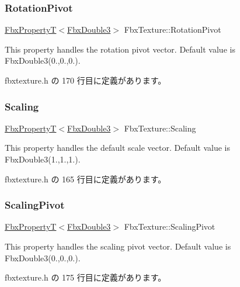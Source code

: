 \subsubsection{\texorpdfstring{Rotation\+Pivot}{RotationPivot}}
{\footnotesize\ttfamily \hyperlink{class_fbx_property_t}{Fbx\+PropertyT}$<$\hyperlink{fbxtypes_8h_ae0a96f14cde566774c7553aa7523b7a7}{Fbx\+Double3}$>$ Fbx\+Texture\+::\+Rotation\+Pivot}

This property handles the rotation pivot vector. Default value is Fbx\+Double3(0.,0.,0.). 

 fbxtexture.\+h の 170 行目に定義があります。

\mbox{\label{class_fbx_texture_a0fb4219993fe8b6fcad89b62d22d2489}} 
\subsubsection{\texorpdfstring{Scaling}{Scaling}}
{\footnotesize\ttfamily \hyperlink{class_fbx_property_t}{Fbx\+PropertyT}$<$\hyperlink{fbxtypes_8h_ae0a96f14cde566774c7553aa7523b7a7}{Fbx\+Double3}$>$ Fbx\+Texture\+::\+Scaling}

This property handles the default scale vector. Default value is Fbx\+Double3(1.,1.,1.). 

 fbxtexture.\+h の 165 行目に定義があります。

\mbox{\label{class_fbx_texture_acf9aad8b79662d0cd8f3d336d0414dee}} 
\subsubsection{\texorpdfstring{Scaling\+Pivot}{ScalingPivot}}
{\footnotesize\ttfamily \hyperlink{class_fbx_property_t}{Fbx\+PropertyT}$<$\hyperlink{fbxtypes_8h_ae0a96f14cde566774c7553aa7523b7a7}{Fbx\+Double3}$>$ Fbx\+Texture\+::\+Scaling\+Pivot}

This property handles the scaling pivot vector. Default value is Fbx\+Double3(0.,0.,0.). 

 fbxtexture.\+h の 175 行目に定義があります。

\mbox{\label{class_fbx_texture_ae8aca07710aa872fa8964408101f8a5b}} 
